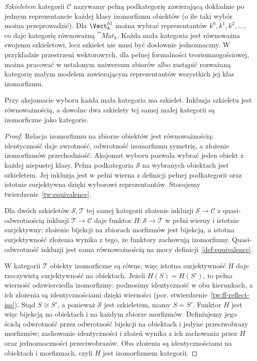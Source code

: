 \begin{przyklad}
\emph{Szkieletem} kategorii $\mathcal C$ nazywamy pełną podkategorię zawierającą dokładnie po jednym reprezentancie każdej klasy izomorfizmu obiektów (o ile taki wybór można przeprowadzić). Dla $\Vect_k^{\mathrm{fd}}$ można wybrać reprezentantów $k^0,k^1,k^2,\ldots$, co daje kategorię równoważną $\cat{Mat}_k$. Każda mała kategoria jest równoważna swojemu szkieletowi, lecz szkielet nie musi być dosłownie jednoznaczny. W przykładzie przestrzeni wektorowych, dla pełnej formalności teoriomnogościowej, można pracować w ustalonym uniwersum zbiorów albo zastąpić rozważaną kategorię małym modelem zawierającym reprezentantów wszystkich jej klas izomorfizmu.
\end{przyklad}

\begin{stwierdzenie}\label{cat:prop:skeleton}
Przy aksjomacie wyboru każda mała kategoria ma szkielet. Inkluzja szkieletu jest równoważnością, a dowolne dwa szkielety tej samej małej kategorii są izomorficzne jako kategorie.
\end{stwierdzenie}
\begin{proof}
Relacja izomorfizmu na zbiorze obiektów jest równoważnością: identyczność daje zwrotność, odwrotność izomorfizmu symetrię, a złożenie izomorfizmów przechodniość. Aksjomat wyboru pozwala wybrać jeden obiekt z każdej niepustej klasy. Pełna podkategoria $\mathcal S$ na wybranych obiektach jest szkieletem. Jej inkluzja jest w pełni wierna z definicji pełnej podkategorii oraz istotnie surjektywna dzięki wyborowi reprezentantów. Stosujemy twierdzenie~\ref{tw:equivalence}.

Dla dwóch szkieletów $\mathcal S,\mathcal T$ tej samej kategorii złożenie inkluzji $\mathcal S\to\mathcal C$ z quasi-odwrotnością inkluzji $\mathcal T\to\mathcal C$ daje funktor $H:\mathcal S\to\mathcal T$ w pełni wierny i istotnie surjektywny: złożenie bijekcji na zbiorach morfizmów jest bijekcją, a istotna surjektywność złożenia wynika z tego, że funktory zachowują izomorfizmy. Quasi-odwrotność inkluzji jest sama równoważnością na mocy definicji~\ref{def:equivalence}.

W kategorii $\mathcal T$ obiekty izomorficzne są równe, więc istotna surjektywność $H$ daje rzeczywistą surjektywność na obiektach. Jeżeli $H(S)=H(S')$, to pełna wierność odzwierciedla izomorfizmy: podnosimy identyczność w obu kierunkach, a ich złożenia są identycznościami dzięki wierności (por. stwierdzenie~\ref{tw:ff-reflect-iso}). Stąd $S\cong S'$, a ponieważ $\mathcal S$ jest szkieletem, mamy $S=S'$. Funktor $H$ jest więc bijekcją na obiektach i na każdym zbiorze morfizmów. Definiujemy jego ścisłą odwrotność przez odwrotność bijekcji na obiektach i jedyne przeciwobrazy morfizmów; zachowanie identyczności i złożeń wynika z ich zachowania przez $H$ oraz jednoznaczności przeciwobrazów. Oba złożenia są identycznościami na obiektach i morfizmach, czyli $H$ jest izomorfizmem kategorii.
\end{proof}

